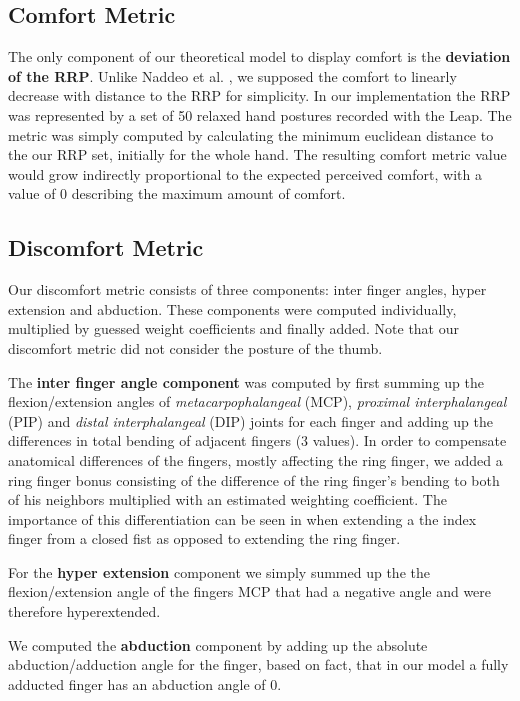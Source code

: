 \documentclass{sig-alternate-05-2015}
\begin{document}
\subsection{Comfort Metric}

The only component of our theoretical model to display comfort is the \textbf{deviation of the RRP}. Unlike Naddeo et al. \cite{naddeo2015proposal}, we supposed the comfort to linearly decrease with distance to the RRP for simplicity. 
In our implementation the RRP was represented by a set of 50 relaxed hand postures recorded with the Leap. The metric was simply computed by calculating the minimum euclidean distance to the our RRP set, initially for the whole hand.
The resulting comfort metric value would grow indirectly proportional to the expected perceived comfort, with a value of 0 describing the maximum amount of comfort. 


\subsection{Discomfort Metric}

Our discomfort metric consists of three components: inter finger angles, hyper extension and abduction. These components were computed individually, multiplied by guessed weight coefficients and finally added. Note that our discomfort metric did not consider the posture of the thumb.

The \textbf{inter finger angle component} was computed by first summing up the flexion/extension angles of \textit{metacarpophalangeal} (MCP), \textit{proximal interphalangeal} (PIP) and \textit{distal interphalangeal} (DIP) joints for each finger and adding up the differences in total bending of adjacent fingers (3 values). In order to compensate anatomical differences of the fingers, mostly affecting the ring finger, we added a ring finger bonus consisting of the difference of the ring finger's bending to both of his neighbors multiplied with an estimated weighting coefficient. The importance of this differentiation can be seen in when extending a the index finger from a closed fist as opposed to extending the ring finger. 

For the \textbf{hyper extension} component we simply summed up the the flexion/extension angle of the fingers MCP that had a negative angle and were therefore hyperextended.

We computed the \textbf{abduction} component by adding up the absolute abduction/adduction angle for the finger, based on fact, that in our model a fully adducted finger has an abduction angle of 0.
\end{document}
